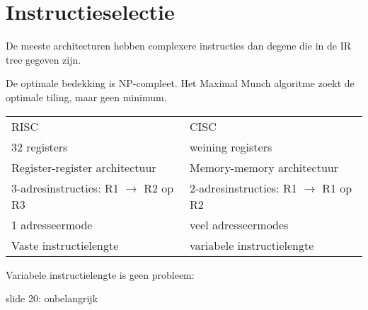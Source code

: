 \chapter{Instructieselectie}

De meeste architecturen hebben complexere instructies dan degene die in de IR tree gegeven zijn.

De optimale bedekking is NP-compleet. Het Maximal Munch algoritme zoekt de optimale tiling, maar geen minimum.



\begin{table}[ht]
	\centering
	\begin{tabular}{l | l}
		RISC & CISC \\
		32 registers & weining registers \\
		Register-register architectuur & Memory-memory architectuur \\
		3-adresinstructies: R1 $\rightarrow$ R2 op R3 & 2-adresinstructies: R1 $\rightarrow$ R1 op R2 \\
		1 adresseermode & veel adresseermodes \\
		Vaste instructielengte & variabele instructielengte \\
	\end{tabular}
\end{table}


Variabele instructielengte is geen probleem:

slide 20: onbelangrijk
